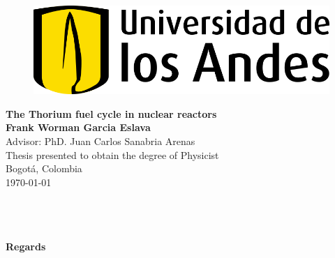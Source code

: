 
\begin{center}
\begin{figure}
    \centering%
    \includegraphics[scale=0.35]{HojaTitulo/Figures_HojaTitulo/Universidad_de_los_Andes_(logo).png} %
\end{figure}
\thispagestyle{empty} \vspace*{2.0cm} \textbf{\LARGE
The Thorium fuel cycle in nuclear reactors}\\[2.5cm]

\Large\textbf{Frank Worman Garcia Eslava}\\[2.0cm]

Advisor: PhD. Juan Carlos Sanabria Arenas \\[2.0cm]


\Large Thesis presented to obtain the degree of Physicist \\ [2.0cm]


Bogot\'{a}, Colombia\\ [0.5cm]
\today \\
\end{center}

\newpage{\pagestyle{empty}\cleardoublepage}

\newpage
\thispagestyle{empty} \textbf{}\normalsize
\\\\\\%
\textbf{\LARGE Regards}\\



\newpage

